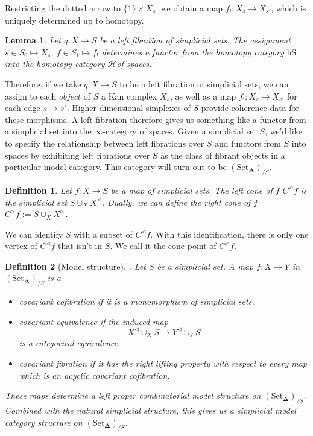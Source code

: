 \documentclass{amsart}
\newcommand{\8}{\ensuremath{\infty}}
\renewcommand{\H}{\ensuremath{\mathcal{H}}}
\newcommand{\SSet}{\ensuremath{\text{Set}_{\boldsymbol{\Delta}}}}
\newtheorem{definition}{Definition}
\newtheorem{lemma}{Lemma}
\begin{document}
Restricting the dotted arrow to $\{1\}\times X_s$, we obtain a map $f_!:X_s\rightarrow X_{s'}$, which is uniquely determined up to homotopy.


\begin{lemma}
  Let $q : X \rightarrow S$ be a left fibration of simplicial sets. The assignment $s \in S_0 \mapsto X_s$, $f \in S_1 \mapsto f_!$ determines a functor from the homotopy category $\text{hS}$ into the homotopy category \H of spaces.
\end{lemma}

Therefore, if we take $q: X\rightarrow S$ to be a left fibration of simplicial sets, we can assign to each $\textit{object}$ of $S$ a Kan complex $X_s$, as well as a map $f_{!}: X_s \rightarrow X_{s'}$ for each edge $s \rightarrow s'$. Higher dimensional simplexes of $S$ provide coherence data for these morphisms. A left fibration therefore gives us something like a functor from a simplicial set into the \8-category of spaces. Given a simplicial set $S$, we'd like to specify the relationship between left fibrations over $S$ and functors from $S$ into spaces by exhibiting left fibrations over $S$ as the class of fibrant objects in a particular model category. This category will turn out to be $(\SSet)_{/S}$.

\begin{definition}
  Let $f:X\rightarrow S$ be a map of simplicial sets. The left cone of $f$ $C^
      {\triangleleft}f$ is the simplicial set $\displaystyle S\cup_X X^{\triangleleft} $. Dually, we can define the right cone of $f$ $C^{\triangleright}f:=\displaystyle S\cup_X X^{\triangleright}$.
\end{definition}

We can identify $S$ with a subset of $C^{\triangleleft}f$. With this identification, there is only one vertex of $C^{\triangleleft}f$ that isn't in $S$. We call it the cone point of $C^{\triangleleft}f$.

\begin{definition}[Model structure]. Let $S$ be a simplicial set. A map $f:X\rightarrow Y$ in $(\SSet)_{/S}$ is a
  \begin{itemize}
    \item covariant cofibration if it is a monomorphism of simplicial sets.
    \item covariant equivalence if the induced map \[X^{\triangleleft}\displaystyle \cup_X S \rightarrow Y^{\triangleleft}\cup_Y S\] is a categorical equivalence.
    \item covariant fibration if it has the right lifting property with respect to every map which is an acyclic covariant cofibration.
  \end{itemize}
  These maps determine a left proper combinatorial model structure on $(\SSet)_{/S}$. Combined with the natural simplicial structure, this gives us a simplicial model category structure on $(\SSet)_{/S}$.
\end{definition}
\end{document}
